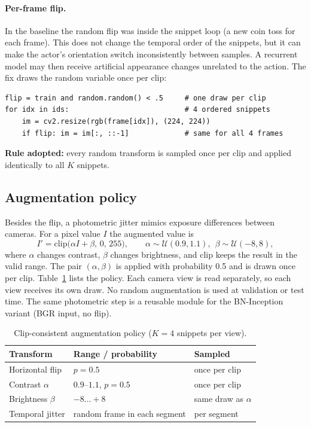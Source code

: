 \documentclass[runningheads]{llncs}
\begin{document}
\paragraph{Per-frame flip.} In the baseline the random flip was inside the snippet loop (a new coin toss for each frame). This does not change the temporal order of the snippets, but it can make the actor's orientation switch inconsistently between samples. A recurrent model may then receive artificial appearance changes unrelated to the action. The fix draws the random variable once per clip:
\begin{verbatim}
flip = train and random.random() < .5     # one draw per clip
for idx in ids:                           # 4 ordered snippets
    im = cv2.resize(rgb(frame[idx]), (224, 224))
    if flip: im = im[:, ::-1]             # same for all 4 frames
\end{verbatim}
\textbf{Rule adopted:} every random transform is sampled once per clip and applied identically to all $K$ snippets.

\subsection{Augmentation policy}
Besides the flip, a photometric jitter mimics exposure differences between cameras. For a pixel value $I$ the augmented value is
\begin{equation}
I'=\mathrm{clip}\big(\alpha I+\beta,\,0,\,255\big),\qquad \alpha\sim\mathcal U(0.9,1.1),\ \ \beta\sim\mathcal U(-8,8),
\end{equation}
where $\alpha$ changes contrast, $\beta$ changes brightness, and $\mathrm{clip}$ keeps the result in the valid range. The pair $(\alpha,\beta)$ is applied with probability 0.5 and is drawn once per clip. Table~\ref{tab:aug} lists the policy. Each camera view is read separately, so each view receives its own draw. No random augmentation is used at validation or test time. The same photometric step is a reusable module for the BN-Inception variant (BGR input, no flip).

\begin{table}[t]
\caption{Clip-consistent augmentation policy ($K{=}4$ snippets per view).}\label{tab:aug}
\centering
\small
\begin{tabular}{lll}
\toprule
Transform & Range / probability & Sampled \\
\midrule
Horizontal flip & $p=0.5$ & once per clip \\
Contrast $\alpha$ & $0.9$--$1.1$, $p=0.5$ & once per clip \\
Brightness $\beta$ & $-8\ldots+8$ & same draw as $\alpha$ \\
Temporal jitter & random frame in each segment & per segment \\
\bottomrule
\end{tabular}
\end{table}
\end{document}
